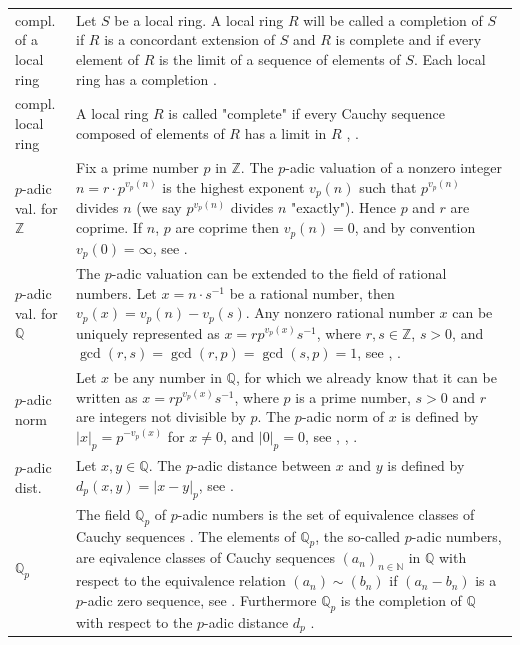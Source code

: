 \documentclass[12pt]{amsart}
\theoremstyle{definition}
\begin{document}
{\renewcommand{\arraystretch}{1.8}
\begin{table}[H]
	\centering
	\begin{tabular}{|P{1.4cm} p{13.4cm}|}
		\hline
		compl. of a local ring & Let $S$ be a local ring. A local ring $R$ will be called a completion of $S$ if $R$ is a concordant extension of $S$ and $R$ is complete and if every element of $R$ is the limit of a sequence of elements of $S$. Each local ring has a completion \cite[p.~92]{Ref_Northcott_1953}.
		\\
		compl. local ring & A local ring $R$ is called "complete" if every Cauchy sequence composed of elements of $R$ has a limit in $R$ \cite[p.~85]{Ref_Northcott_1953}, \cite[p.~184]{Ref_Kemper_2011}.
		\\
		$p$-adic val. for $\mathbb{Z}$ & Fix a prime number $p$ in $\mathbb{Z}$. The $p$-adic valuation of a nonzero integer $n=r\cdot p^{v_p(n)}$ is the highest exponent $v_p(n)$ such that $p^{v_p(n)}$ divides $n$ (we say $p^{v_p(n)}$ divides $n$ "exactly"). Hence $p$ and $r$ are coprime. If $n$, $p$ are coprime then $v_p(n)=0$, and by convention $v_p(0)=\infty$, see \cite{Ref_Herwig_2011}.
		\\
		$p$-adic val. for $\mathbb{Q}$ & The $p$-adic valuation can be extended to the field of rational numbers. Let $x=n\cdot s^{-1}$ be a rational number, then $v_p(x)=v_p(n)-v_p(s)$. Any nonzero rational number $x$ can be uniquely represented as $x=rp^{v_p(x)}s^{-1}$, where $r,s\in\mathbb{Z}$, $s>0$, and $\gcd(r,s)=\gcd(r,p)=\gcd(s,p)=1$, see \cite[p.~154]{Ref_Schmidt_2007}, \cite{Ref_Weisstein_1}.
		\\
		$p$-adic norm & Let $x$ be any number in $\mathbb{Q}$, for which we already know that it can be written as $x=rp^{v_p(x)}s^{-1}$, where $p$ is a prime number, $s>0$ and $r$ are integers not divisible by $p$. The $p$-adic norm of $x$ is defined by $|x|_p=p^{-v_p(x)}$ for $x\ne0$, and $|0|_p=0$, see \cite{Ref_Herwig_2011}, \cite[p.~154]{Ref_Schmidt_2007}, \cite{Ref_Weisstein_2}.
		\\
		$p$-adic dist. &  Let $x,y\in\mathbb{Q}$. The $p$-adic distance between $x$ and $y$ is defined by $d_p(x,y)=|x-y|_p$, see \cite[p.~155]{Ref_Schmidt_2007}.
		\\
		$\mathbb{Q}_p$ & The field $\mathbb{Q}_p$ of $p$-adic numbers is the set of equivalence classes of Cauchy sequences \cite[p.~10]{Ref_Koblitz_1984}. The elements of $\mathbb{Q}_p$, the so-called $p$-adic numbers, are eqivalence classes of Cauchy sequences $(a_n)_{n\in\mathbb{N}}$ in $\mathbb{Q}$ with respect to the equivalence relation $(a_n)\sim(b_n)$ if $(a_n-b_n)$ is a $p$-adic zero sequence, see \cite[p.~159]{Ref_Schmidt_2007}. Furthermore $\mathbb{Q}_p$ is the completion of $\mathbb{Q}$ with respect to the $p$-adic distance $d_p$ \cite[p.~159]{Ref_Schmidt_2007}. 

\end{tabular}
\end{table}}
\end{document}
